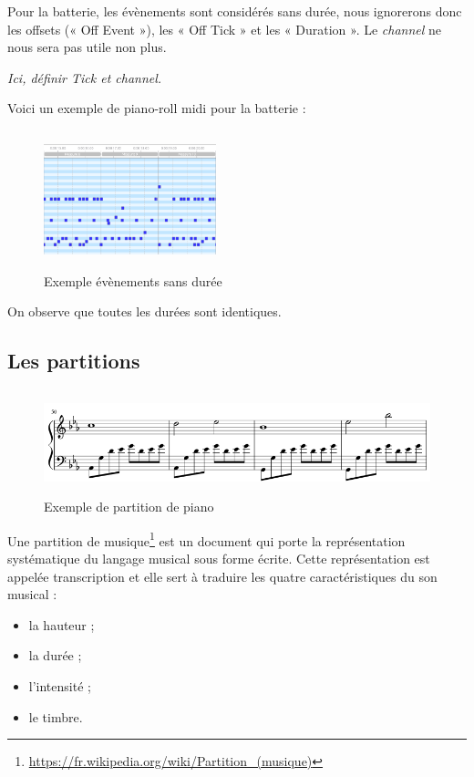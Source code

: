 Pour la batterie, les évènements sont considérés sans durée, nous ignorerons donc les offsets (« Off Event »), les « Off Tick » et les « Duration ». 
Le \textit{channel} ne nous sera pas utile non plus.

\textit{Ici, définir Tick et channel.}

Voici un exemple de piano-roll midi pour la batterie :
\begin{figure}[h!]
	\centering
	\includegraphics[height=40mm, width=50mm]{z_images/1_contexte/4_midi_batterie.png}
	\caption{Exemple évènements sans durée}
\end{figure}

On observe que toutes les durées sont identiques.
\subsection*{Les partitions}
\begin{figure}[h!]
	\centering
	\includegraphics[height=30mm, width=120mm]{z_images/1_contexte/5_partition_piano.png}
	\caption{Exemple de partition de piano}
\end{figure}

Une partition de musique\footnote{\url{https://fr.wikipedia.org/wiki/Partition\_(musique)}} est un document qui porte la représentation systématique du langage musical sous forme écrite. Cette représentation est appelée transcription et elle sert à traduire les quatre caractéristiques du son musical :
\begin{itemize}
	\item la hauteur ;
	\item la durée ;
	\item l'intensité ;
	\item le timbre.
\end{itemize}

